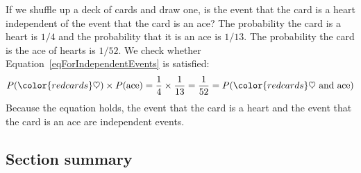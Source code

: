 \begin{examplewrap}
\begin{nexample}{If we shuffle up a deck of cards and draw one, is the event that the card is a heart independent of the event that the card is an ace?}
The probability the card is a heart is $1/4$ and the probability that it is an ace is $1/13$. The probability the card is the ace of hearts is $1/52$. We check whether Equation~\ref{eqForIndependentEvents} is satisfied:
\begin{align*}
P({\color{redcards}\heartsuit})\times P(\text{ace}) = \frac{1}{4}\times \frac{1}{13} = \frac{1}{52}
					= P({\color{redcards}\heartsuit}\text{ and ace})
\end{align*}
Because the equation holds, the event that the card is a heart and the event that the card is an ace are independent events.
\end{nexample}
\end{examplewrap}


\D{\newpage}

\subsection*{Section summary}

